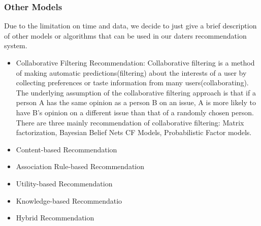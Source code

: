 \subsubsection{Other Models }
Due to the limitation on time and data, we decide to just give a brief description of other models or algorithms that can be used in our daters recommendation system.

\begin{itemize}
	\item Collaborative Filtering Recommendation:
	Collaborative filtering is a method of making automatic predictions(filtering) about the interests of a user by collecting preferences or taste information from many users(collaborating). The underlying assumption of the collaborative filtering approach is that if a person A has the same opinion as a person B on an issue, A is more likely to have B's opinion on a different issue than that of a randomly chosen person. There are three mainly recommendation of collaborative filtering: Matrix factorization, Bayesian Belief Nets CF Models, Probabilistic Factor models.
	\item Content-based Recommendation
	\item Association Rule-based Recommendation
	\item Utility-based Recommendation
	\item Knowledge-based Recommendatio
	\item Hybrid Recommendation
\end{itemize}
%
%
%
%
%
%
%
%

